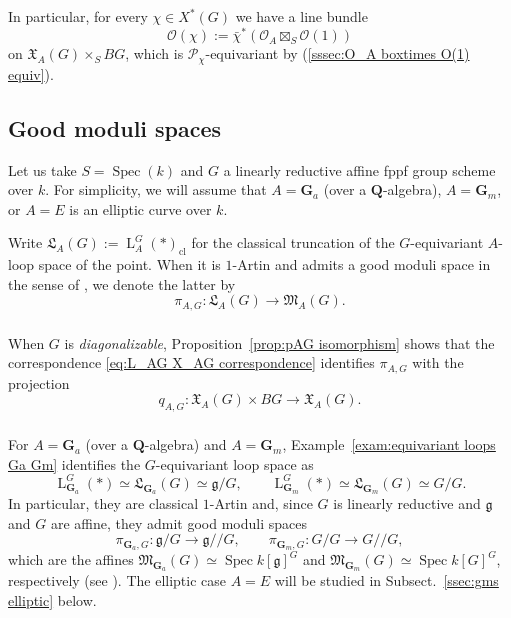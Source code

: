 \documentclass[12pt, oneside]{amsart}
\numberwithin{equation}{section}
\theoremstyle{remark}
\theoremstyle{plain}
\newcommand{\frM}{\mathfrak{M}}
\newcommand{\frL}{\mathfrak{L}}
\newcommand{\frX}{\mathfrak{X}}
\newcommand{\Loop}{\operatorname{L}}
\newcommand{\OO}{\mathcal{O}}
\DeclareMathOperator{\spc}{Spec}
\newcommand{\modmod}{/\!\!/}
\newcommand{\GGa}{\mathbf{G}_{a}}
\newcommand{\GGm}{\mathbf{G}_{m}}
\newcommand{\bQ}{\mathbf{Q}}
\newcommand{\cl}{{\operatorname{cl}}}
\begin{document}
In particular, for every $\chi \in X^*(G)$ we have a line bundle
\[ \OO(\chi) := \bar{\chi}^*(\OO_A \boxtimes_S \OO(1)) \]
on $\frX_A(G) \times_S BG$, which is $\mathcal{P}_\chi$-equivariant by (\ref{sssec:O_A boxtimes O(1) equiv}).

\subsection{Good moduli spaces}\label{ssec:gms Ga Gm}

Let us take $S=\spc(k)$ and $G$ a linearly reductive affine fppf group scheme over $k$.
For simplicity, we will assume that $A=\GGa$ (over a $\bQ$-algebra), $A=\GGm$, or $A=E$ is an elliptic curve over $k$.

Write $\frL_A(G) := \Loop_A^G(*)_\cl$ for the classical truncation of the $G$-equivariant $A$-loop space of the point.
When it is $1$-Artin and admits a good moduli space in the sense of \cite{Alper}, we denote the latter by
\[
  \pi_{A,G} : \frL_A(G) \to \frM_A(G).
\]

\subsubsection{}

When $G$ is \emph{diagonalizable}, Proposition~\ref{prop:pAG isomorphism} shows that the correspondence \eqref{eq:L_AG X_AG correspondence} identifies $\pi_{A,G}$ with the projection
\[ q_{A,G} : \frX_A(G) \times BG \to \frX_A(G). \]

\subsubsection{}

For $A=\GGa$ (over a $\bQ$-algebra) and $A=\GGm$, Example~\ref{exam:equivariant loops Ga Gm} identifies the $G$-equivariant loop space as
\[
  \Loop_{\GGa}^G(*) \simeq \frL_{\GGa}(G) \simeq \mathfrak{g}/G, \qquad
  \Loop_{\GGm}^G(*) \simeq \frL_{\GGm}(G) \simeq G/G.
\]
In particular, they are classical $1$-Artin and, since $G$ is linearly reductive and $\mathfrak{g}$ and $G$ are affine, they admit good moduli spaces
\[
  \pi_{\GGa,G} : \mathfrak{g}/G \to \mathfrak{g} \modmod G,\qquad
  \pi_{\GGm,G} : G/G \to G \modmod G,
\]
which are the affines $\frM_{\GGa}(G) \simeq \spc k[\mathfrak{g}]^G$ and $\frM_{\GGm}(G) \simeq \spc k[G]^G$, respectively (see \cite[Thm.~13.2]{Alper}).
The elliptic case $A=E$ will be studied in Subsect.~\ref{ssec:gms elliptic} below.
\end{document}
